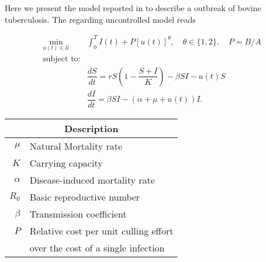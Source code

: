 Here we present the model reported in \cite*{Bolzoni2014} to describe a 
outbreak of bovine tuberculosis. The regarding uncontrolled model reads

\begin{equation}
	\begin{aligned}
  \min_{u(t)\in \mathcal{U}}
    &
    \int_0^T
      I(t) + P [u(t)]^{\theta}, \quad \theta \in \{1,2\},
      \quad P = B/A
  \\ \textrm{subject to:} &
  \\
    &\dfrac{dS}{dt} =
			r S 
			\left (
				1 - \dfrac{S+I}{K}
			\right)
			 - \beta SI - u(t) S
		\\
		&\dfrac{dI}{dt} =
			\beta SI - (\alpha + \mu + u(t)) I.
	\end{aligned}
\end{equation}
%
\begin{table}
  \begin{center}
    \begin{tabular}{@{}rl@{}}
        \toprule
      \multicolumn{2}{c}{\bf{Description}}
      \\
      \midrule
      $\mu$
        & Natural Mortality rate
      \\
      $K$
        & Carrying capacity
      \\
      $\alpha$
        & Disease-induced mortality rate
      \\
      $R_0$
        & Basic reproductive number
      \\
      $\beta$
        & Transmission coefficient
      \\
      $P$
        & Relative cost per unit culling effort \\
        & over the cost of a single infection
      \\
      \bottomrule
    \end{tabular}
  \end{center}
\end{table}